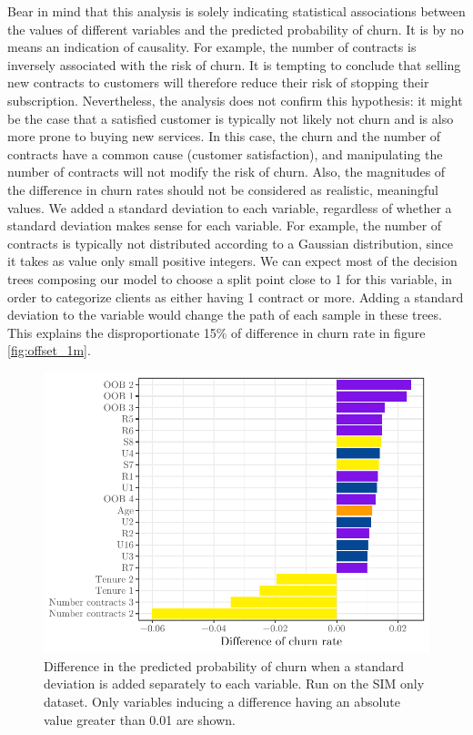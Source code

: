 Bear in mind that this analysis is solely indicating statistical associations
between the values of different variables and the predicted probability of
churn. It is by no means an indication of causality. For example, the number of
contracts is inversely associated with the risk of churn. It is tempting to
conclude that selling new contracts to customers will therefore reduce their
risk of stopping their subscription. Nevertheless, the analysis does not confirm
this hypothesis: it might be the case that a satisfied customer is typically not
likely not churn and is also more prone to buying new services. In this case,
the churn and the number of contracts have a common cause (customer
satisfaction), and manipulating the number of contracts will not modify the risk
of churn. Also, the magnitudes of the difference in churn rates should not be
considered as realistic, meaningful values. We added a standard deviation to
each variable, regardless of whether a standard deviation makes sense for each
variable. For example, the number of contracts is typically not distributed
according to a Gaussian distribution, since it takes as value only small
positive integers. We can expect most of the decision trees composing our model
to choose a split point close to 1 for this variable, in order to categorize
clients as either having 1 contract or more. Adding a standard deviation to the
variable would change the path of each sample in these trees. This explains the
disproportionate 15\% of difference in churn rate in figure \ref{fig:offset_1m}.

\begin{figure}
    \centering
    \includegraphics[width=0.9\linewidth]{figures/offset_1p.pdf}
    \caption{Difference in the predicted probability of churn when a standard
    deviation is added separately to each variable. Run on the SIM only dataset.
    Only variables inducing a difference having an absolute value greater than
    0.01 are shown.}
    \label{fig:offset_1p}
\end{figure}

